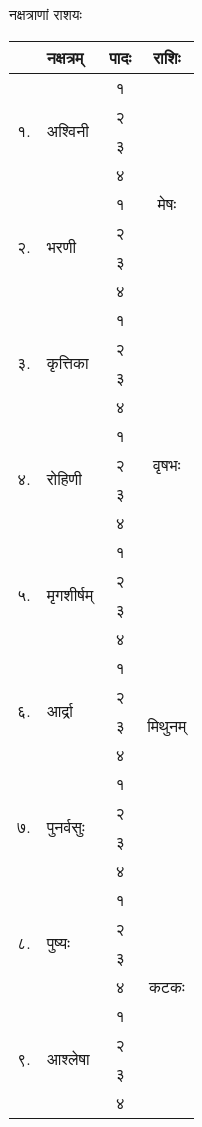 नक्षत्राणां राशयः


{\small\renewcommand{\arraystretch}{0.333}
\begin{tabular}{|l@{~}l|>{\tiny}c|c|}
\hline
& नक्षत्रम् & \small{पादः} & राशिः\\\hline
\multirow{4}{*}{ १.} & \multirow{4}{*}{अश्विनी}                  & १&  \multirow{9}{*}{मेषः} \\ 
&& २& \\
&& ३& \\
&& ४& \\
\cline{1-3}\multirow{4}{*}{ २.} & \multirow{4}{*}{भरणी}                     & १&  \\
&& २& \\
&& ३& \\
&& ४& \\
\cline{1-3}\multirow{4}{*}{ ३.} & \multirow{4}{*}{कृत्तिका}                 & १&  \\
\cline{3-4} & & २&  \multirow{9}{*}{वृषभः} \\ 
&& ३& \\
&& ४& \\
\cline{1-3}\multirow{4}{*}{ ४.} & \multirow{4}{*}{रोहिणी}                   & १&  \\
&& २& \\
&& ३& \\
&& ४& \\
\cline{1-3}\multirow{4}{*}{ ५.} & \multirow{4}{*}{मृगशीर्षम्}               & १&  \\
&& २& \\
\cline{3-4} & & ३&  \multirow{9}{*}{मिथुनम्} \\ 
&& ४& \\
\cline{1-3}\multirow{4}{*}{ ६.} & \multirow{4}{*}{आर्द्रा}                  & १&  \\
&& २& \\
&& ३& \\
&& ४& \\
\cline{1-3}\multirow{4}{*}{ ७.} & \multirow{4}{*}{पुनर्वसुः}                & १&  \\
&& २& \\
&& ३& \\
\cline{3-4} & & ४&  \multirow{9}{*}{कटकः} \\
\cline{1-3}\multirow{4}{*}{ ८.} & \multirow{4}{*}{पुष्यः}                   & १&  \\
&& २& \\
&& ३& \\
&& ४& \\
\cline{1-3}\multirow{4}{*}{ ९.} & \multirow{4}{*}{आश्लेषा}                  & १&  \\
&& २& \\
&& ३& \\
&& ४& \\\hline
\end{tabular}

}
